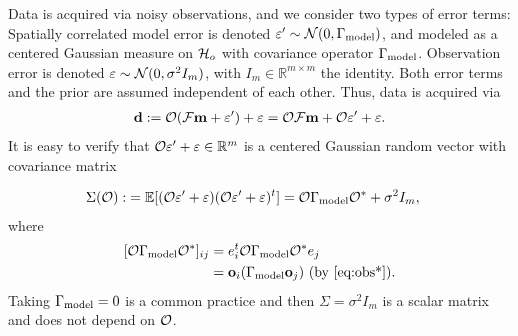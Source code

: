 Data is acquired via noisy observations, and we consider two types of
error terms: Spatially correlated model error is denoted $\varepsilon' \sim
\mathcal{N}(0,\Gamma_{\textup{model}})$, and modeled as a centered Gaussian measure on
$\mathcal{H}_o$ with covariance operator $\Gamma_{\textup{model}}$. Observation error is
denoted $\varepsilon \sim \mathcal{N}(0, \sigma^2 I_m)$, with $I_m \in
\mathbb{R}^{m \times m}$ the identity. Both error terms and the prior
are assumed independent of each other. Thus, data is acquired via
\begin{align}\label{eq:inverse problem}
  \data := \obs (\fwd \param + \eps') + \eps = \obs \fwd \param + \obs \eps' + \eps.
\end{align}
It is easy to verify that $\mathcal{O} \varepsilon' + \varepsilon \in \mathbb{R}^m$ is a centered
Gaussian random vector with covariance matrix

\begin{align}\label{eq:Sigma}
  \begin{split}
    \Sigma(\obs) :&= \mathbb{E}[ (\obs \eps' + \eps) (\obs \eps' +
      \eps)^t ]
    = \obs \modcov \obs^* + \sigma^2I_m , 
  \end{split}
\end{align}
where
\begin{align}\label{eq:modcov explained}
  \begin{split}
    [\obs \modcov \obs^*]_{ij} & = e_i^t \obs \modcov \obs^* e_j \\
    &= \meas_i (\modcov \meas_j) \text{ (by \eqref{eq:obs*})}.
  \end{split}
\end{align}
Taking $\Gamma_{\textup{model}} = 0$ is a common practice
\cite{Tarantola05,Kaipio2006,Vogel02} and then $\Sigma = \sigma^2I_m$
is a scalar matrix and does not depend on $\mathcal{O}$.

